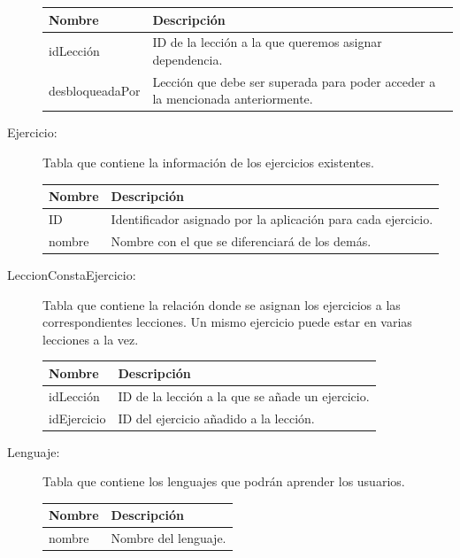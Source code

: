 \begin{description}
\begin{tabularx}{14cm}{|l|X|}
\hline
\textbf{Nombre} & \textbf{Descripción}                                                              \\ \hline
idLección       & ID de la lección a la que queremos asignar dependencia.                                                          \\ \hline
desbloqueadaPor     & Lección que debe ser superada para poder acceder a la mencionada anteriormente.                                           \\ \hline
\end{tabularx}

\item[Ejercicio:] Tabla que contiene la información de los ejercicios existentes.

\begin{tabularx}{14cm}{|l|X|}
\hline
\textbf{Nombre} & \textbf{Descripción}                                                              \\ \hline
ID       & Identificador asignado por la aplicación para cada ejercicio. \\ \hline
nombre     & Nombre con el que se diferenciará de los demás.                                           \\ \hline
\end{tabularx}

\item[LeccionConstaEjercicio:] Tabla que contiene la relación donde se asignan los ejercicios a las correspondientes lecciones. Un mismo ejercicio puede estar en varias lecciones a la vez.

\begin{tabularx}{14cm}{|l|X|}
\hline
\textbf{Nombre} & \textbf{Descripción}                                                              \\ \hline
idLección       & ID de la lección a la que se añade un ejercicio. \\ \hline
idEjercicio     & ID del ejercicio añadido a la lección.                                           \\ \hline
\end{tabularx}

\item[Lenguaje:] Tabla que contiene los lenguajes que podrán aprender los usuarios.

\begin{tabularx}{14cm}{|l|X|}
\hline
\textbf{Nombre} & \textbf{Descripción}                                                              \\ \hline
nombre       & Nombre del lenguaje. \\ \hline
\end{tabularx}


\end{description}
